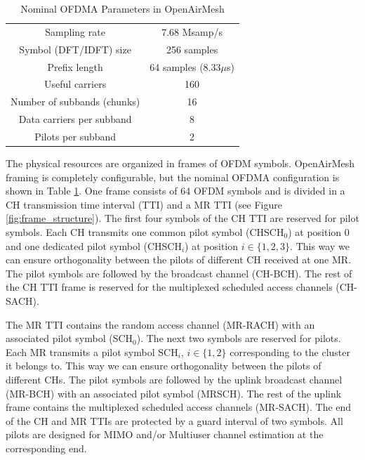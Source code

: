 \documentclass[a4paper,twocolumn,journal]{IEEEtran}
\begin{document}
\begin{table}
\centering
\begin{tabular}{|c|c|}
  \hline
Sampling rate & 7.68 Msamp/s \\
Symbol (DFT/IDFT) size & 256 samples \\
Prefix length & 64 samples (8.33$\mu$s) \\
Useful carriers & 160 \\
Number of subbands (chunks) & 16 \\
Data carriers per subband & 8 \\
Pilots per subband & 2 \\\hline
\end{tabular}
\caption{Nominal OFDMA Parameters in OpenAirMesh \label{tab:framing}}
\vspace{-0.4cm}
\end{table}

The physical resources are organized in frames of OFDM symbols. OpenAirMesh framing is completely configurable, but the nominal OFDMA configuration is shown in Table \ref{tab:framing}. One frame consists of 64 OFDM symbols and is  divided in a CH transmission time interval (TTI) and a MR TTI (see Figure \ref{fig:frame_structure}). The first four symbols of the CH TTI are reserved for pilot symbols. Each CH transmits one common pilot symbol (CHSCH$_0$) at position 0 and one dedicated pilot symbol (CHSCH$_i$) at position $i \in \{1,2,3\}$. This way we can ensure orthogonality between the pilots of different CH received at one MR. The pilot symbols are followed by the broadcast channel (CH-BCH).  The rest of the CH TTI frame is reserved for the multiplexed scheduled access channels (CH-SACH).


The MR TTI contains the random access channel (MR-RACH) with an associated pilot symbol (SCH$_0$). The next two symbols are reserved for pilots. Each MR transmits a pilot symbol SCH$_i$, $i \in \{1,2\}$ corresponding to the cluster it belongs to. This way we can ensure orthogonality between the pilots of different CHs. 
The pilot symbols are followed by the uplink broadcast channel (MR-BCH) with an associated pilot symbol (MRSCH). The rest of the uplink frame contains the multiplexed scheduled access channels (MR-SACH). The end of the CH and MR TTIs are protected by a guard interval of two symbols. All pilots are designed for MIMO and/or Multiuser channel estimation at the corresponding end. 
\end{document}
